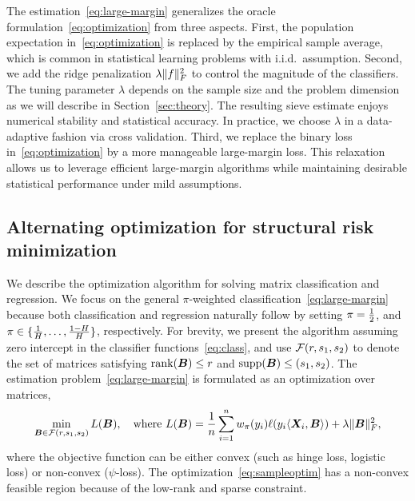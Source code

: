 \documentclass[11pt]{article}
\theoremstyle{plain}
\theoremstyle{definition}
\begin{document}
The estimation~\eqref{eq:large-margin} generalizes the oracle formulation~\eqref{eq:optimization} from three aspects. First, the population expectation in~\eqref{eq:optimization} is replaced by the empirical sample average, which is common in statistical learning problems with i.i.d.\ assumption. Second, we add the ridge penalization $\lambda\lVert f\rVert_F^2$ to control the magnitude of the classifiers. The tuning parameter $\lambda$ depends on the sample size and the problem dimension as we will describe in Section~\ref{sec:theory}. The resulting sieve estimate enjoys numerical stability and statistical accuracy. In practice, we choose $\lambda$ in a data-adaptive fashion via cross validation. Third, we replace the binary loss in~\eqref{eq:optimization} by a more manageable large-margin loss. This relaxation allows us to leverage efficient large-margin algorithms while maintaining desirable statistical performance under mild assumptions. 


\subsection{Alternating optimization for structural risk minimization}
We describe the optimization algorithm for solving matrix classification and regression. We focus on the general $\pi$-weighted classification~\eqref{eq:large-margin} because both classification and regression naturally follow by setting $\pi={1\over 2}$, and $\pi\in\{{1\over H},\ldots,{1-H\over H}\}$, respectively. For brevity, we present the algorithm assuming zero intercept in the classifier functions~\eqref{eq:class}, and use $\mathcal{F}(r,s_1,s_2)$ to denote the set of matrices satisfying $\text{rank}(\bm B)\leq r$ and $\text{supp}(\bm B)\leq (s_1,s_2)$. The estimation problem~\eqref{eq:large-margin} is formulated as an optimization over matrices,
\begin{equation}\label{eq:sampleoptim}
\min_{\bm B \in \mathcal{F}(r,s_1,s_2)}L(\bm B),\quad \text{where }L(\bm B)={1\over n}\sum_{i=1}^nw_\pi(y_i)\ell(y_i\langle \bm X_i,\bm B \rangle) + \lambda\lVert\bm B\rVert_F^2,
\end{equation}
where the objective function can be either convex (such as hinge loss, logistic loss) or non-convex ($\psi$-loss). The optimization~\eqref{eq:sampleoptim} has a non-convex feasible region because of the low-rank and sparse constraint. 
\end{document}
